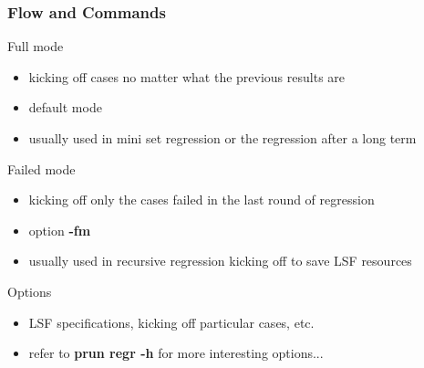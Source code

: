 \documentclass{beamer}
\begin{document}
\begin{frame}
  \frametitle{Flow and Commands}
  \begin{block}{Full mode}
    \begin{itemize}
    \item kicking off cases no matter what the previous results are
    \item default mode
    \item usually used in mini set regression or the regression after a long term
    \end{itemize}
  \end{block}

  \begin{block}{Failed mode}
    \begin{itemize}
    \item kicking off only the cases failed in the last round of regression
    \item option \textbf{-fm}
    \item usually used in recursive regression kicking off to save LSF resources
    \end{itemize}
  \end{block}

  \begin{block}{Options}
    \begin{itemize}
    \item LSF specifications, kicking off particular cases, etc.
    \item refer to \textbf{prun regr -h} for more interesting options...
    \end{itemize}
  \end{block}
\end{frame}

\end{document}

